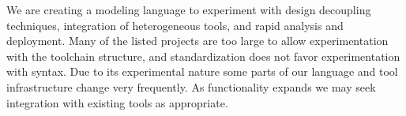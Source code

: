 We are creating a modeling 
language to experiment with design decoupling techniques, integration of heterogeneous tools, 
and rapid analysis and deployment.  Many of the listed projects are too large to allow 
experimentation with the toolchain structure, and standardization does not favor 
experimentation with syntax.  Due to its experimental nature some parts of our language and tool 
infrastructure change very frequently.  As functionality expands we may seek integration with 
existing tools as appropriate.
